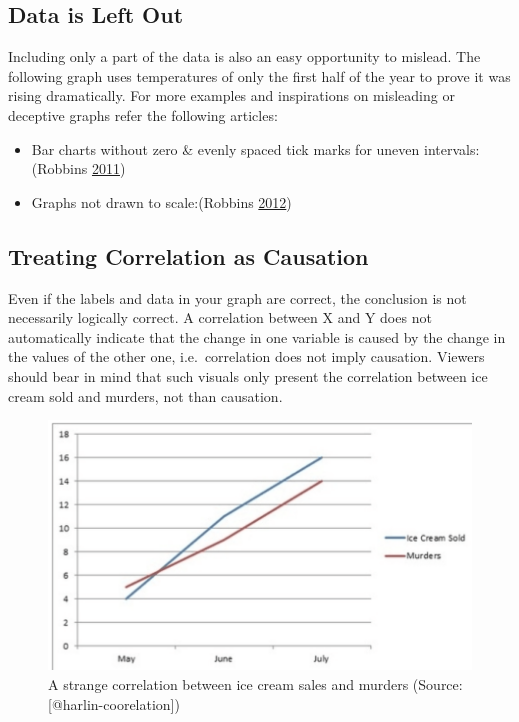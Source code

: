 \documentclass[]{book}
\providecommand{\tightlist}{%
  \setlength{\itemsep}{0pt}\setlength{\parskip}{0pt}}
\theoremstyle{definition}
\theoremstyle{definition}
\theoremstyle{definition}
\theoremstyle{remark}
\begin{document}
\subsection{Data is Left Out}\label{data-is-left-out}

Including only a part of the data is also an easy opportunity to
mislead. The following graph uses temperatures of only the first half of
the year to prove it was rising dramatically. For more examples and
inspirations on misleading or deceptive graphs refer the following
articles:

\begin{itemize}
\tightlist
\item
  Bar charts without zero \& evenly spaced tick marks for uneven
  intervals: (Robbins \protect\hyperlink{ref-whats_wrong}{2011})
\item
  Graphs not drawn to scale:(Robbins
  \protect\hyperlink{ref-scaling_issues}{2012})
\end{itemize}

\subsection{Treating Correlation as
Causation}\label{treating-correlation-as-causation}

Even if the labels and data in your graph are correct, the conclusion is
not necessarily logically correct. A correlation between X and Y does
not automatically indicate that the change in one variable is caused by
the change in the values of the other one, i.e.~correlation does not
imply causation. Viewers should bear in mind that such visuals only
present the correlation between ice cream sold and murders, not than
causation.

\begin{figure}
\includegraphics[width=0.7\linewidth]{images/harlin-ice-cream} \caption{A strange correlation between ice cream sales and murders (Source: [@harlin-coorelation])}\label{fig:harlin-ice-cream}
\end{figure}
\end{document}
